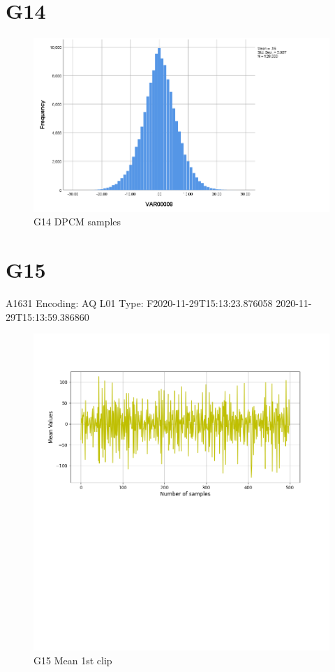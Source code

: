\documentclass[hidelinks, 12pt, a4paper]{article}
\begin{document}
\section{G14}
\begin{figure}[h!]
	\centering
		\includegraphics[height=.38\textheight, width=\textwidth]{assets/session2/g14.png}
		\caption{G14 DPCM  samples}
	\end{figure}

\section{G15}
A1631
Encoding: AQ L01
Type: F2020-11-29T15:13:23.876058
2020-11-29T15:13:59.386860
\begin{figure}[h!]
\centering
	\includegraphics[height=.38\textheight, width=\textwidth]{assets/session2/g15.png}
    \caption{G15 Mean 1st clip}
\end{figure}
\end{document}
